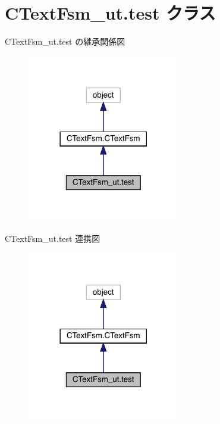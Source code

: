 \hypertarget{classCTextFsm__ut_1_1test}{}\section{C\+Text\+Fsm\+\_\+ut.\+test クラス}
\label{classCTextFsm__ut_1_1test}


C\+Text\+Fsm\+\_\+ut.\+test の継承関係図
\nopagebreak
\begin{figure}[H]
\begin{center}
\leavevmode
\includegraphics[width=189pt]{classCTextFsm__ut_1_1test__inherit__graph}
\end{center}
\end{figure}


C\+Text\+Fsm\+\_\+ut.\+test 連携図
\nopagebreak
\begin{figure}[H]
\begin{center}
\leavevmode
\includegraphics[width=189pt]{classCTextFsm__ut_1_1test__coll__graph}
\end{center}
\end{figure}
